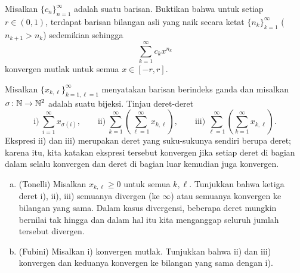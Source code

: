 \begin{exercise}
Misalkan $\{ c_n \}_{n=1}^\infty$ adalah suatu barisan.  Buktikan bahwa untuk setiap $r \in (0,1)$,
terdapat barisan bilangan asli yang naik secara ketat $\{ n_k \}_{k=1}^\infty$
($n_{k+1} > n_k$) sedemikian sehingga
\begin{equation*}
\sum_{k=1}^\infty c_k x^{n_k}
\end{equation*}
konvergen mutlak untuk semua $x \in [-r,r]$.
\end{exercise}

\begin{exercise}
\label{exercise:tonellifubiniforsums}%
%
Misalkan $\{ x_{k,\ell} \}_{k=1,\ell=1}^\infty$ menyatakan barisan
berindeks ganda dan misalkan $\sigma \colon {\mathbb{N}} \to {\mathbb{N}}^2$ adalah suatu bijeksi.
Tinjau deret-deret
\begin{equation*}
\text{i)}~\sum_{i=1}^\infty x_{\sigma(i)},
\qquad
\text{ii)}~\sum_{k=1}^\infty \left( \sum_{\ell=1}^\infty x_{k,\ell} \right),
\qquad
\text{iii)}~\sum_{\ell=1}^\infty \left( \sum_{k=1}^\infty x_{k,\ell} \right) .
\end{equation*}
Ekspresi ii) dan iii) merupakan deret yang suku-sukunya sendiri berupa deret; karena itu, kita katakan ekspresi tersebut konvergen
jika setiap deret di bagian dalam selalu konvergen dan deret di bagian luar kemudian juga
konvergen.
\begin{enumerate}[a)]
\item
(Tonelli) Misalkan $x_{k,\ell} \geq 0$ untuk semua $k,\ell$.
Tunjukkan bahwa ketiga deret i), ii), iii) semuanya divergen (ke $\infty$)
atau semuanya konvergen ke bilangan yang sama.
Dalam kasus divergensi, beberapa deret  mungkin bernilai tak hingga
dan dalam hal itu kita menganggap seluruh jumlah tersebut divergen.
\item
(Fubini) Misalkan i) konvergen mutlak.  Tunjukkan bahwa ii) dan iii)
konvergen dan keduanya konvergen ke bilangan yang sama dengan i).
\end{enumerate}
\end{exercise}
